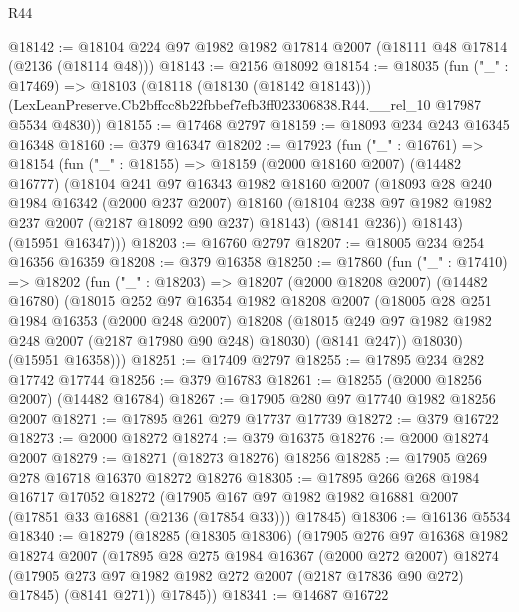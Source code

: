 \begin{lexlean}{R44}
\begin{coremodule}
@18142 := @18104 @224 @97 @1982 @1982 @17814 @2007 (@18111 @48 @17814 (@2136 (@18114 @48)))
@18143 := @2156 @18092
@18154 := @18035
    (fun ("_" : @17469) =>
    @18103
      (@18118 (@18130 (@18142 @18143)))
      (LexLeanPreserve.Cb2bffcc8b22fbbef7efb3ff023306838.R44.__rel_10 @17987 @5534 @4830))
@18155 := @17468 @2797
@18159 := @18093 @234 @243 @16345 @16348
@18160 := @379 @16347
@18202 := @17923
    (fun ("_" : @16761) =>
    @18154
      (fun ("_" : @18155) =>
      @18159
        (@2000 @18160 @2007)
        (@14482 @16777)
        (@18104
          @241
          @97
          @16343
          @1982
          @18160
          @2007
          (@18093
            @28
            @240
            @1984
            @16342
            (@2000 @237 @2007)
            @18160
            (@18104 @238 @97 @1982 @1982 @237 @2007 (@2187 @18092 @90 @237) @18143)
            (@8141 @236))
          @18143)
        (@15951 @16347)))
@18203 := @16760 @2797
@18207 := @18005 @234 @254 @16356 @16359
@18208 := @379 @16358
@18250 := @17860
    (fun ("_" : @17410) =>
    @18202
      (fun ("_" : @18203) =>
      @18207
        (@2000 @18208 @2007)
        (@14482 @16780)
        (@18015
          @252
          @97
          @16354
          @1982
          @18208
          @2007
          (@18005
            @28
            @251
            @1984
            @16353
            (@2000 @248 @2007)
            @18208
            (@18015 @249 @97 @1982 @1982 @248 @2007 (@2187 @17980 @90 @248) @18030)
            (@8141 @247))
          @18030)
        (@15951 @16358)))
@18251 := @17409 @2797
@18255 := @17895 @234 @282 @17742 @17744
@18256 := @379 @16783
@18261 := @18255 (@2000 @18256 @2007) (@14482 @16784)
@18267 := @17905 @280 @97 @17740 @1982 @18256 @2007
@18271 := @17895 @261 @279 @17737 @17739
@18272 := @379 @16722
@18273 := @2000 @18272
@18274 := @379 @16375
@18276 := @2000 @18274 @2007
@18279 := @18271 (@18273 @18276) @18256
@18285 := @17905 @269 @278 @16718 @16370 @18272 @18276
@18305 := @17895
    @266
    @268
    @1984
    @16717
    @17052
    @18272
    (@17905 @167 @97 @1982 @1982 @16881 @2007 (@17851 @33 @16881 (@2136 (@17854 @33))) @17845)
@18306 := @16136 @5534
@18340 := @18279
    (@18285
      (@18305 @18306)
      (@17905
        @276
        @97
        @16368
        @1982
        @18274
        @2007
        (@17895
          @28
          @275
          @1984
          @16367
          (@2000 @272 @2007)
          @18274
          (@17905 @273 @97 @1982 @1982 @272 @2007 (@2187 @17836 @90 @272) @17845)
          (@8141 @271))
        @17845))
@18341 := @14687 @16722

\end{coremodule}
\end{lexlean}
